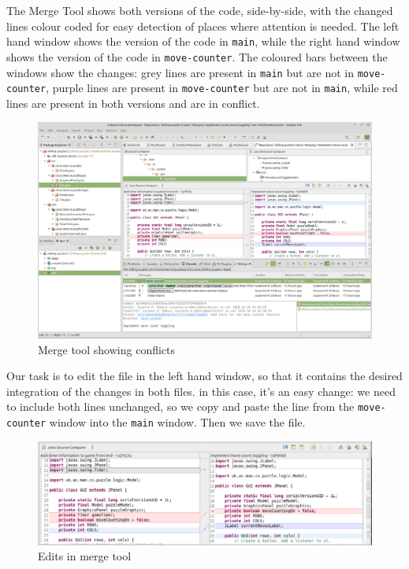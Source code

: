 \documentclass[
]{book}
\begin{document}
The Merge Tool shows both versions of the code, side-by-side, with the changed lines colour coded for easy detection of places where attention is needed. The left hand window shows the version of the code in \texttt{main}, while the right hand window shows the version of the code in \texttt{move-counter}. The coloured bars between the windows show the changes: grey lines are present in \texttt{main} but are not in \texttt{move-counter}, purple lines are present in \texttt{move-counter} but are not in \texttt{main}, while red lines are present in both versions and are in conflict.

\begin{figure}

{\centering \includegraphics[width=1\linewidth]{images/mergeToolShowingConflicts} 

}

\caption{Merge tool showing conflicts}\label{fig:mergeToolShowingConflicts-fig}
\end{figure}

Our task is to edit the file in the left hand window, so that it contains the desired integration of the changes in both files. in this case, it's an easy change: we need to include both lines unchanged, so we copy and paste the line from the \texttt{move-counter} window into the \texttt{main} window. Then we save the file.

\begin{figure}

{\centering \includegraphics[width=1\linewidth]{images/editsInMergeTool} 

}

\caption{Edits in merge tool}\label{fig:editsInMergeTool-fig}
\end{figure}
\end{document}
